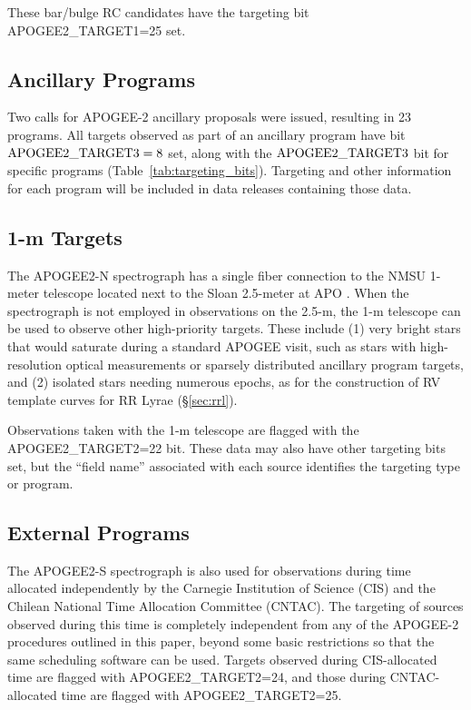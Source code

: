 \documentclass[12pt,twocolumn]{emulateapj}
\begin{document}
These bar/bulge RC candidates have the targeting bit APOGEE2\_TARGET1=25 set.


\subsection{Ancillary Programs}
\label{sec:ancillary}

Two calls for APOGEE-2 ancillary proposals were issued, resulting in 23 programs.
All targets observed as part of an ancillary program have bit ${\rm APOGEE2\_TARGET}3={\rm 8}$ set,
along with the ${\rm APOGEE2\_TARGET}3$ bit for specific programs (Table~\ref{tab:targeting_bits}).
Targeting and other information for each program will be included in data releases containing those data.

\subsection{1-m Targets}
\label{sec:1m}

The APOGEE2-N spectrograph has a single fiber connection to the NMSU 1-meter telescope located next to the Sloan 2.5-meter at APO \citep{Holtzman_2010_nmsu1m,Majewski_2017_apogeeoverview}.  When the spectrograph is not employed in observations on the 2.5-m, the 1-m telescope can be used to observe other high-priority targets.  These include (1) very bright stars that would saturate during a standard APOGEE visit, such as stars with high-resolution optical measurements or sparsely distributed ancillary program targets, and (2) isolated stars needing numerous epochs, as for the construction of RV template curves for RR Lyrae (\S\ref{sec:rrl}).  

Observations taken with the 1-m telescope are flagged with the APOGEE2\_TARGET2=22 bit.  These data may also have other targeting bits set, but the ``field name'' associated with each source identifies the targeting type or program.

\subsection{External Programs}
\label{sec:external}

The APOGEE2-S spectrograph is also used for observations during time allocated independently by the Carnegie Institution of Science (CIS) and the Chilean National Time Allocation Committee (CNTAC).  The targeting of sources observed during this time is completely independent from any of the APOGEE-2 procedures outlined in this paper, beyond some basic restrictions so that the same scheduling software can be used.  Targets observed during CIS-allocated time are flagged with APOGEE2\_TARGET2=24, and those during CNTAC-allocated time are flagged with APOGEE2\_TARGET2=25.
\end{document}
